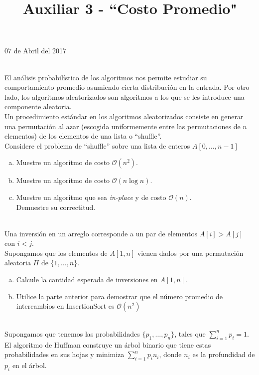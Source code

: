 \documentclass[dcc,uchile]{fcfmcourse}
\title{Auxiliar 3 - ``Costo Promedio"}
\begin{document}
\maketitle
\begin{center}
07 de Abril del 2017
\end{center}
\vspace{-1ex}


\begin{problems}

\\
El análisis probabilístico de los algoritmos nos permite estudiar su comportamiento promedio asumiendo cierta distribución en la entrada. Por otro lado, los algoritmos aleatorizados son algoritmos a los que se les introduce una componente aleatoria.\\ Un procedimiento estándar en los algoritmos aleatorizados consiste en generar una permutación al azar (escogida uniformemente entre las permutaciones de $n$ elementos) de los elementos de una lista o ``shuffle''.\\
Considere el problema de ``shuffle'' sobre una lista de enteros $A[0,\ldots,n-1]$
\begin{enumerate}[a)]
    \item Muestre un algoritmo de costo $\mathcal{O}(n^2)$.
    \item Muestre un algoritmo de costo $\mathcal{O}(n\log n)$.
    \item Muestre un algoritmo que sea \textit{in-place} y de costo $\mathcal{O}(n)$.\\ Demuestre su correctitud.
\end{enumerate}
\\
Una inversión en un arreglo corresponde a un par de elementos $A[i] > A[j]$ con $i < j$.\\
Supongamos que los elementos de $A[1, n]$ vienen
dados por una permutación aleatoria $\Pi$ de $\{1,\ldots, n\}$. 
\begin{enumerate}[a)]
    \item Calcule la cantidad esperada de inversiones en $A[1, n]$.
    \item Utilice la parte anterior para demostrar que el número promedio de intercambios en InsertionSort es $\mathcal{O}(n^2)$
\end{enumerate}
\\
Supongamos que tenemos las probabilidades $\{p_{1},\ldots, p_{n}\}$, tales que $\sum_{i=1}^n p_{i} = 1$. El algoritmo de Huffman construye un árbol binario que tiene estas probabilidades en sus hojas y minimiza $\sum_{i=1}^n p_{i}n_{i}$, donde $n_{i}$ es la profundidad de $p_{i}$ en el árbol.

\end{problems}
\end{document}
